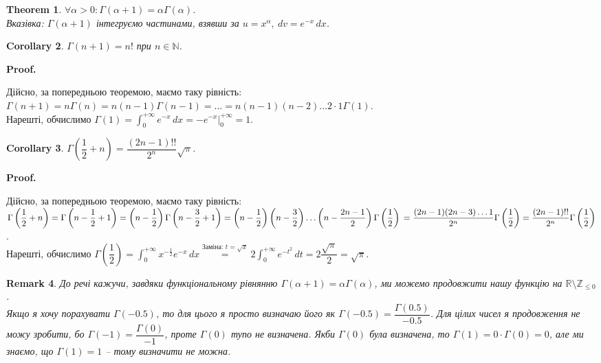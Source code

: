 \documentclass[a4paper, 10pt]{article}
\makeatletter
\def\huge{\displaystyle}
\theoremstyle{theoremdd}
\newtheorem{theorem}{Theorem}[subsection]
\theoremstyle{theoremdd}
\theoremstyle{theoremdd}
\theoremstyle{theoremdd}
\theoremstyle{theoremdd}
\theoremstyle{theoremdd}
\theoremstyle{theoremdd}
\newtheorem{remark}[theorem]{Remark}
\theoremstyle{theoremdd}
\theoremstyle{theoremdd}
\newtheorem{corollary}[theorem]{Corollary}
\renewenvironment{proof}[1][Proof.\\]{\par
\pushQED{\hfill \qed}%
\normalfont \topsep6\p@\@plus6\p@\relax
\trivlist
\item\relax
{\bfseries
#1\@addpunct{.}}\hspace\labelsep\ignorespaces
}{%
\popQED\endtrivlist\@endpefalse
}
\makeatother
\begin{document}
\begin{theorem}
$\forall \alpha > 0: \Gamma (\alpha+1) = \alpha \Gamma (\alpha)$.\\
\textit{Вказівка: $\Gamma(\alpha+1)$ інтегруємо частинами, взявши за} $u = x^{\alpha},\ dv = e^{-x}\,dx$.
\end{theorem}

\begin{corollary}
$\Gamma(n+1) = n!$ при $n \in \mathbb{N}$.
\end{corollary}

\begin{proof}
Дійсно, за попередньою теоремою, маємо таку рівність:\\
$\Gamma(n+1) = n \Gamma (n) = n(n-1) \Gamma (n-1) = \dots = n(n-1)(n-2)\dots 2 \cdot 1 \Gamma (1)$.\\
Нарешті, обчислимо $\Gamma(1) = \huge \int_0^{+\infty} e^{-x}\,dx = -e^{-x} \Big|_{0}^{+\infty} = 1$.
\end{proof}

\begin{corollary}
$\Gamma \left( \dfrac{1}{2} + n \right) = \dfrac{(2n-1)!!}{2^n} \sqrt{\pi}$.
\end{corollary}

\begin{proof}
Дійсно, за попередньою теоремою, маємо таку рівність:\\
$\Gamma\left( \dfrac{1}{2}+n\right) = \Gamma\left( n - \dfrac{1}{2} + 1 \right) = \left( n - \dfrac{1}{2} \right) \Gamma\left( n - \dfrac{3}{2} + 1\right) = \left( n - \dfrac{1}{2} \right) \left( n - \dfrac{3}{2} \right) \dots \left( n - \dfrac{2n-1}{2} \right) \Gamma\left( \dfrac{1}{2} \right) \\
= \dfrac{(2n-1)(2n-3) \dots 1}{2^n} \Gamma\left( \dfrac{1}{2}\right) = \dfrac{(2n-1)!!}{2^n} \Gamma\left( \dfrac{1}{2}\right)$.\\
Нарешті, обчислимо $\Gamma \left( \dfrac{1}{2} \right) = \huge \int_0^{+\infty} x^{-\frac{1}{2}}e^{-x}\,dx \overset{\textrm{Заміна: } t = \sqrt{x}}{=} 2 \huge \int_0^{+\infty} e^{-t^2}\,dt = 2 \dfrac{\sqrt{\pi}}{2} = \sqrt{\pi}$.
\end{proof}

\begin{remark}
До речі кажучи, завдяки функціональному рівнянню $\Gamma(\alpha+1) = \alpha \Gamma(\alpha)$, ми можемо продовжити нашу функцію на $\mathbb{R} \setminus \mathbb{Z}_{\leq 0}$.\\
Якщо я хочу порахувати $\Gamma(-0.5)$, то для цього я просто визначаю його як $\Gamma(-0.5) = \dfrac{\Gamma(0.5)}{-0.5}$. Для цілих чисел я продовження не можу зробити, бо $\Gamma(-1) = \dfrac{\Gamma(0)}{-1}$, проте $\Gamma(0)$ тупо не визначена. Якби $\Gamma(0)$ була визначена, то $\Gamma(1) = 0 \cdot \Gamma(0) = 0$, але ми знаємо, що $\Gamma(1) =1$ -- тому визначити не можна.
\end{remark}
\end{document}
